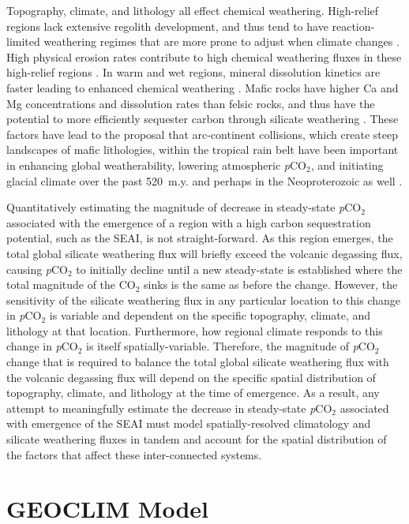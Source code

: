 \documentclass[9pt,twocolumn,twoside,lineno]{pnas-new}
\newcommand{\pCOtwo}{\textit{p}CO$_{2}$\xspace}
\newcommand{\COtwo}{CO$_{2}$\xspace}
\begin{document}
Topography, climate, and lithology all effect chemical weathering. High-relief regions lack extensive regolith development, and thus tend to have reaction-limited weathering regimes that are more prone to adjust when climate changes \cite{Gabet2009a, West2012a, Maher2014a}. High physical erosion rates contribute to high chemical weathering fluxes in these high-relief regions \citep{Godderis2017b}. In warm and wet regions, mineral dissolution kinetics are faster leading to enhanced chemical weathering \cite{Lasaga1994a, West2012a}. Mafic rocks have higher Ca and Mg concentrations and dissolution rates than felsic rocks, and thus have the potential to more efficiently sequester carbon through silicate weathering \cite{Dessert2003a}. These factors have lead to the proposal that arc-continent collisions, which create steep landscapes of mafic lithologies, within the tropical rain belt have been important in enhancing global weatherability, lowering atmospheric \pCOtwo, and initiating glacial climate over the past 520~m.y. \cite{Jagoutz2016a, Swanson-Hysell2017a, Macdonald2019a} and perhaps in the Neoproterozoic as well \cite{Park2019b}.

Quantitatively estimating the magnitude of decrease in steady-state \pCOtwo associated with the emergence of a region with a high carbon sequestration potential, such as the SEAI, is not straight-forward. As this region emerges, the total global silicate weathering flux will briefly exceed the volcanic degassing flux, causing \pCOtwo to initially decline until a new steady-state is established where the total magnitude of the \COtwo sinks is the same as before the change. However, the sensitivity of the silicate weathering flux in any particular location to this change in \pCOtwo is variable and dependent on the specific topography, climate, and lithology at that location. Furthermore, how regional climate responds to this change in \pCOtwo is itself spatially-variable. Therefore, the magnitude of \pCOtwo change that is required to balance the total global silicate weathering flux with the volcanic degassing flux will depend on the specific spatial distribution of topography, climate, and lithology at the time of emergence. As a result, any attempt to meaningfully estimate the decrease in steady-state \pCOtwo associated with emergence of the SEAI must model spatially-resolved climatology and silicate weathering fluxes in tandem and account for the spatial distribution of the factors that affect these inter-connected systems.

\section*{GEOCLIM Model}
\end{document}
